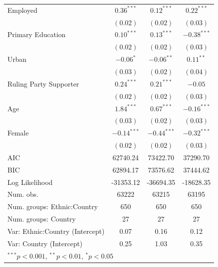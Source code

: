 \documentclass[12pt,]{book}
\let\origtable\table
\let\endorigtable\endtable
\renewenvironment{table}[1][2] {
    \singlespacing
    \expandafter\origtable\expandafter[H]
} {
    \endorigtable
}
\theoremstyle{definition}
\theoremstyle{definition}
\theoremstyle{definition}
\theoremstyle{remark}
\begin{document}
\begin{table}
\begin{center}
\begin{tabular}{l c c c }
Employed                                & $0.36^{***}$  & $0.12^{***}$  & $0.22^{***}$  \\
                                        & $(0.02)$      & $(0.02)$      & $(0.03)$      \\
Primary Education                       & $0.10^{***}$  & $0.13^{***}$  & $-0.38^{***}$ \\
                                        & $(0.02)$      & $(0.02)$      & $(0.03)$      \\
Urban                                   & $-0.06^{*}$   & $-0.06^{**}$  & $0.11^{**}$   \\
                                        & $(0.03)$      & $(0.02)$      & $(0.04)$      \\
Ruling Party Supporter                  & $0.24^{***}$  & $0.21^{***}$  & $-0.05$       \\
                                        & $(0.02)$      & $(0.02)$      & $(0.03)$      \\
Age                                     & $1.84^{***}$  & $0.67^{***}$  & $-0.16^{***}$ \\
                                        & $(0.03)$      & $(0.02)$      & $(0.03)$      \\
Female                                  & $-0.14^{***}$ & $-0.44^{***}$ & $-0.32^{***}$ \\
                                        & $(0.02)$      & $(0.02)$      & $(0.03)$      \\
\hline
AIC                                     & 62740.24      & 73422.70      & 37290.70      \\
BIC                                     & 62894.17      & 73576.62      & 37444.62      \\
Log Likelihood                          & -31353.12     & -36694.35     & -18628.35     \\
Num. obs.                               & 63222         & 63215         & 63195         \\
Num. groups: Ethnic:Country             & 650           & 650           & 650           \\
Num. groups: Country                    & 27            & 27            & 27            \\
Var: Ethnic:Country (Intercept)         & 0.07          & 0.16          & 0.12          \\
Var: Country (Intercept)                & 0.25          & 1.03          & 0.35          \\
\hline
\multicolumn{4}{l}{\scriptsize{$^{***}p<0.001$, $^{**}p<0.01$, $^*p<0.05$}}
\end{tabular}
\caption{Multilevel Models of Political Participation}
\label{tab:partic}
\end{center}
\end{table}
\end{document}
